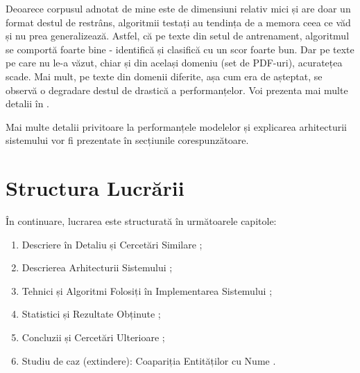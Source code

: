Deoarece corpusul adnotat de mine este de dimensiuni relativ mici și are doar un format destul de restrâns, algoritmii testați au tendința de a memora ceea ce văd și nu prea generalizează. Astfel, că pe texte din setul de antrenament, algoritmul se comportă foarte bine - identifică și clasifică cu un scor foarte bun. Dar pe texte pe care nu le-a văzut, chiar și din același domeniu (set de PDF-uri), acuratețea scade. Mai mult, pe texte din domenii diferite, așa cum era de așteptat, se observă o degradare destul de drastică a performanțelor. Voi prezenta mai multe detalii în .

Mai multe detalii privitoare la performanțele modelelor și explicarea arhitecturii sistemului vor fi prezentate în secțiunile corespunzătoare.

\section{Structura Lucrării}

În continuare, lucrarea este structurată în următoarele capitole:

\begin{enumerate}

\item Descriere în Detaliu și Cercetări Similare ;
\item Descrierea Arhitecturii Sistemului ;
\item Tehnici și Algoritmi Folosiți în Implementarea Sistemului ;
\item Statistici și Rezultate Obținute ;
\item Concluzii și Cercetări Ulterioare ;
\item Studiu de caz (extindere): Coapariția Entităților cu Nume .

\end{enumerate}
